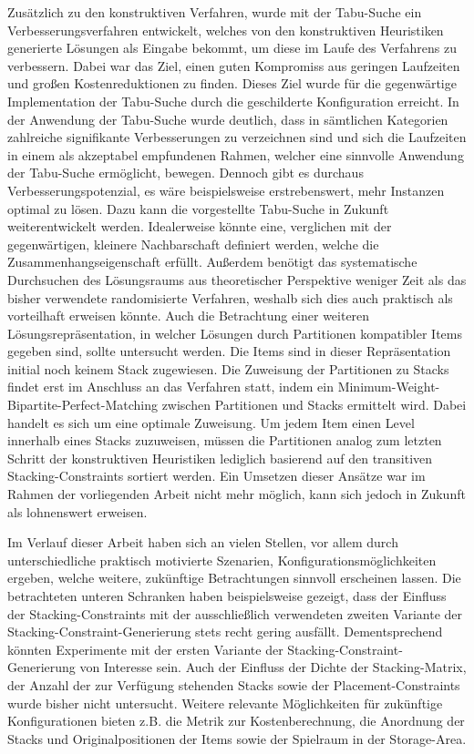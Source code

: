 Zusätzlich zu den konstruktiven Verfahren, wurde mit der Tabu-Suche ein Verbesserungsverfahren entwickelt,
welches von den konstruktiven Heuristiken generierte Lösungen als Eingabe bekommt, um diese
im Laufe des Verfahrens zu verbessern. Dabei war das Ziel, einen guten Kompromiss aus geringen Laufzeiten
und großen Kostenreduktionen zu finden. Dieses Ziel wurde für die gegenwärtige Implementation der Tabu-Suche durch die geschilderte Konfiguration erreicht. In der Anwendung der Tabu-Suche wurde deutlich, dass in sämtlichen Kategorien zahlreiche signifikante Verbesserungen zu verzeichnen sind und sich die Laufzeiten in einem als akzeptabel empfundenen Rahmen, welcher eine sinnvolle Anwendung der Tabu-Suche ermöglicht, bewegen.
Dennoch gibt es durchaus Verbesserungspotenzial, es wäre beispielsweise erstrebenswert,
mehr Instanzen optimal zu lösen. Dazu kann die vorgestellte Tabu-Suche in Zukunft weiterentwickelt werden.
Idealerweise könnte eine, verglichen mit der gegenwärtigen, kleinere Nachbarschaft definiert werden, welche die Zusammenhangseigenschaft erfüllt.
Außerdem benötigt das systematische Durchsuchen des Lösungsraums aus theoretischer Perspektive weniger Zeit
als das bisher verwendete randomisierte Verfahren, weshalb sich dies auch praktisch als vorteilhaft erweisen könnte.
Auch die Betrachtung einer weiteren Lösungsrepräsentation, in welcher Lösungen durch Partitionen kompatibler Items
gegeben sind, sollte untersucht werden. Die Items sind in dieser Repräsentation initial noch
keinem Stack zugewiesen. Die Zuweisung der Partitionen zu Stacks findet erst im Anschluss an das Verfahren statt, indem ein Minimum-Weight-Bipartite-Perfect-Matching zwischen Partitionen und Stacks ermittelt wird. Dabei handelt es sich um eine optimale Zuweisung. Um jedem Item einen Level innerhalb eines Stacks zuzuweisen, müssen die Partitionen
analog zum letzten Schritt der konstruktiven Heuristiken lediglich basierend auf den transitiven Stacking-Constraints
sortiert werden. Ein Umsetzen dieser Ansätze war im Rahmen der vorliegenden Arbeit nicht mehr möglich, kann sich
jedoch in Zukunft als lohnenswert erweisen.

Im Verlauf dieser Arbeit haben sich an vielen Stellen, vor allem durch unterschiedliche praktisch motivierte Szenarien, Konfigurationsmöglichkeiten ergeben, welche weitere, zukünftige Betrachtungen sinnvoll erscheinen lassen.
Die betrachteten unteren Schranken haben beispielsweise gezeigt, dass der Einfluss der Stacking-Constraints mit der ausschließlich verwendeten zweiten Variante der Stacking-Constraint-Generierung stets recht gering ausfällt. Dementsprechend könnten Experimente mit der ersten Variante der Stacking-Constraint-Generierung von Interesse sein.
Auch der Einfluss der Dichte der Stacking-Matrix, der Anzahl der zur Verfügung stehenden Stacks sowie der Placement-Constraints wurde bisher nicht untersucht. Weitere relevante Möglichkeiten für zukünftige Konfigurationen bieten z.B. die Metrik zur Kostenberechnung, die Anordnung der Stacks und Originalpositionen der Items sowie der Spielraum in der Storage-Area.

